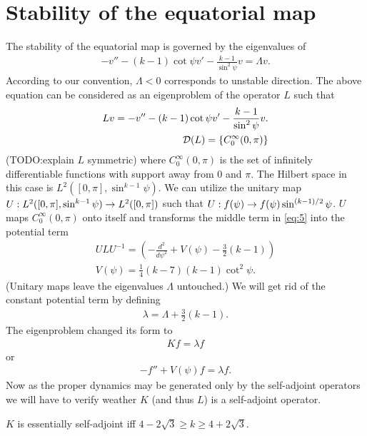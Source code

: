 \section{Stability of the equatorial map}
\label{sec:stab-equat-map}

The stability of the equatorial map is governed by the eigenvalues of
\begin{align}
  \label{eq:4}
  -v''-(k-1)\cot\psi v'-\frac{k-1}{\sin^2\psi}v=\Lambda v.
\end{align}
According to our convention, $\Lambda<0$ corresponds to unstable
direction. The above equation can be considered as an eigenproblem of
the operator $L$ such that
\begin{align}
  \label{eq:5}
  Lv=-v''-(k-1)\cot\psi v'-\frac{k-1}{\sin^2\psi}v.\\
  \mathcal{D}(L)=\{C^\infty_0(0,\pi)\}
\end{align}
(TODO:explain $L$ symmetric) where $C^\infty_0(0,\pi)$ is the set of
infinitely differentiable functions with support away from $0$ and
$\pi$. The Hilbert space in this case is
$L^2([0,\pi],\sin^{k-1}\psi)$. We can utilize the unitary map
$U:L^2([0,\pi],\sin^{k-1}\psi)\rightarrow L^2([0,\pi])$ such that
$U:f(\psi)\rightarrow f(\psi)\sin^{(k-1)/2}\psi$. $U$ maps $C_0^\infty(0,\pi)$
onto itself and transforms the middle term in \eqref{eq:5} into the
potential term
\begin{align}
  \label{eq:7}
  ULU^{-1}=\left(
    -\frac{d^2}{d\psi^2}+V(\psi)-\frac{3}{2}(k-1)\right)\\
  V(\psi)=\frac{1}{4}(k-7)(k-1)\cot^2\psi.
\end{align}
(Unitary maps leave the eigenvalues $\Lambda$ untouched.) We will get
rid of the constant potential term by defining
\begin{align}
  \label{eq:8}
  \lambda=\Lambda+\frac{3}{2}(k-1).
\end{align}
The eigenproblem changed its form to
\begin{align}
  \label{eq:9}
  Kf=\lambda f
\end{align}
or
\begin{align}
  \label{eq:15}
  -f''+V(\psi)f=\lambda f.
\end{align}
Now as the proper dynamics may be generated only by the self-adjoint
operators we will have to verify weather $K$ (and thus $L$) is a
self-adjoint operator.
\begin{theorem}
  $K$ is essentially self-adjoint iff $4-2\sqrt{3}\ge
  k\ge4+2\sqrt{3}$.
\end{theorem}
